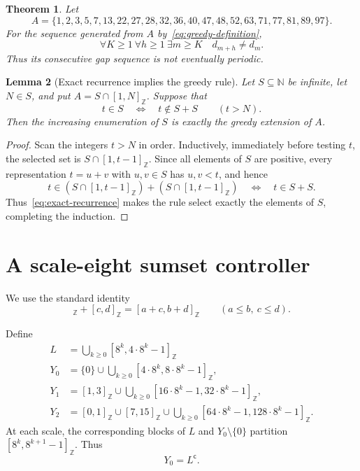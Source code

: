 \documentclass[11pt,letterpaper]{article}
\newtheorem{theorem}{Theorem}[section]
\newtheorem{lemma}[theorem]{Lemma}
\newcommand{\N}{\mathbb{N}}
\newcommand{\cpl}[1]{#1^{\mathsf{c}}}
\newcommand{\ints}[2]{[#1,#2]_{\mathbb{Z}}}
\begin{document}
\begin{theorem}\label{thm:main}
Let
\[
A=\{1,2,3,5,7,13,22,27,28,32,36,40,47,48,52,63,71,77,81,89,97\}.
\]
For the sequence generated from \(A\) by~\eqref{eq:greedy-definition},
\[
\forall K\geq1\ \forall h\geq1\ \exists m\geq K
\quad d_{m+h}\neq d_m.
\]
Thus its consecutive gap sequence is not eventually periodic.
\end{theorem}

\begin{lemma}[Exact recurrence implies the greedy rule]\label{lem:greedy}
Let \(S\subseteq\N\) be infinite, let \(N\in S\), and put \(A=S\cap\ints{1}{N}\). Suppose that
\begin{equation}\label{eq:exact-recurrence}
t\in S
\quad\Longleftrightarrow\quad
t\notin S+S
\qquad (t>N).
\end{equation}
Then the increasing enumeration of \(S\) is exactly the greedy extension of \(A\).
\end{lemma}

\begin{proof}
Scan the integers \(t>N\) in order. Inductively, immediately before testing \(t\), the selected set is \(S\cap\ints{1}{t-1}\). Since all elements of \(S\) are positive, every representation \(t=u+v\) with \(u,v\in S\) has \(u,v<t\), and hence
\[
t\in(S\cap\ints{1}{t-1})+(S\cap\ints{1}{t-1})
\quad\Longleftrightarrow\quad t\in S+S.
\]
Thus~\eqref{eq:exact-recurrence} makes the rule select exactly the elements of \(S\), completing the induction.
\end{proof}

\section{A scale-eight sumset controller}

We use the standard identity
\begin{equation}
\ints{a}{b}+\ints{c}{d}=\ints{a+c}{b+d}
\qquad (a\leq b,\ c\leq d).
\end{equation}

Define
\begin{align}
L&=\bigcup_{k\geq0}\ints{8^k}{4\cdot8^k-1} \\
Y_0&=\{0\}\cup
      \bigcup_{k\geq0}\ints{4\cdot8^k}{8\cdot8^k-1},
      \label{eq:Y0}\\
Y_1&=\ints{1}{3}\cup
      \bigcup_{k\geq0}\ints{16\cdot8^k-1}{32\cdot8^k-1},
      \label{eq:Y1}\\
Y_2&=\ints{0}{1}\cup\ints{7}{15}\cup
      \bigcup_{k\geq0}\ints{64\cdot8^k-1}{128\cdot8^k-1}.
      \label{eq:Y2}
\end{align}
At each scale, the corresponding blocks of \(L\) and \(Y_0\setminus\{0\}\) partition \(\ints{8^k}{8^{k+1}-1}\). Thus
\begin{equation}\label{eq:Y0-complement-L}
Y_0=\cpl{L}.
\end{equation}
\end{document}

